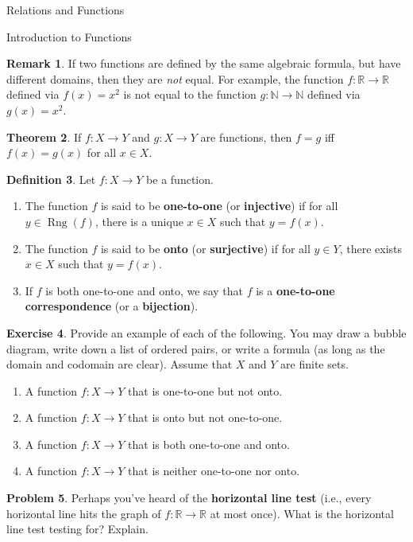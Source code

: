 \documentclass[11pt]{article}
\newcommand{\range}{\operatorname{Rng}}
\theoremstyle{definition}
\newtheorem{theorem}{Theorem}[section]
\newtheorem{definition}[theorem]{Definition}
\newtheorem{exercise}[theorem]{Exercise}
\newtheorem{problem}[theorem]{Problem}
\newtheorem{remark}[theorem]{Remark}
\begin{document}
\begin{section}{Relations and Functions}
\begin{subsection}{Introduction to Functions}
\begin{remark}
If two functions are defined by the same algebraic formula, but have different domains, then they are \emph{not} equal.  For example, the function $f:\mathbb{R}\to \mathbb{R}$ defined via $f(x)=x^{2}$ is not equal to the function $g:\mathbb{N}\to\mathbb{N}$ defined via $g(x)=x^{2}$.
\end{remark}

\begin{theorem}
If $f:X\to Y$ and $g:X\to Y$ are functions, then $f=g$ iff $f(x)=g(x)$ for all $x\in X$.
\end{theorem}

\begin{definition}
Let $f:X\to Y$ be a function.
\begin{enumerate}
\item The function $f$ is said to be \textbf{one-to-one} (or \textbf{injective}) if for all $y\in \range(f)$, there is a unique $x\in X$ such that $y=f(x)$.
\item The function $f$ is said to be \textbf{onto} (or \textbf{surjective}) if for all $y\in Y$, there exists $x\in X$ such that $y=f(x)$.
\item If $f$ is both one-to-one and onto, we say that $f$ is a \textbf{one-to-one correspondence} (or a \textbf{bijection}).
\end{enumerate}
\end{definition}

\begin{exercise}
Provide an example of each of the following.  You may draw a bubble diagram, write down a list of ordered pairs, or write a formula (as long as the domain and codomain are clear).  Assume that $X$ and $Y$ are finite sets.
\begin{enumerate}
\item A function $f:X\to Y$ that is one-to-one but not onto.
\item A function $f:X\to Y$ that is onto but not one-to-one.
\item A function $f:X\to Y$ that is both one-to-one and onto.
\item A function $f:X\to Y$ that is neither one-to-one nor onto.
\end{enumerate}

\end{exercise}

\begin{problem}
Perhaps you've heard of the \textbf{horizontal line test} (i.e., every horizontal line hits the graph of $f:\mathbb{R}\to\mathbb{R}$ at most once).  What is the horizontal line test testing for?  Explain.
\end{problem}


\end{subsection}
\end{section}
\end{document}
